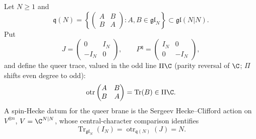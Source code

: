 \begin{defn}\label{defn:spin-hecke-queer-input}
  Let \(N\ge1\) and
  \[
    \mathfrak q(N)=
    \left\{
      \begin{pmatrix} A&B\\ B&A\end{pmatrix}:
      A,B\in\mathfrak{gl}_N
    \right\}\subset\mathfrak{gl}(N|N).
  \]
  Put
  \[
    J=\begin{pmatrix}0&I_N\\ -I_N&0\end{pmatrix},
    \qquad
    P^{\mathfrak q}=\begin{pmatrix}I_N&0\\0&-I_N\end{pmatrix},
  \]
  and define the queer trace, valued in the odd line \(\Pi\C\) (parity
  reversal of \(\C\); \(\Pi\) shifts even degree to odd):
  \[
    \operatorname{otr}
      \begin{pmatrix}A&B\\ B&A\end{pmatrix}
      =\operatorname{Tr}(B)\in\Pi\C .
  \]
  A spin-Hecke datum for the queer brane is the Sergeev
  Hecke--Clifford action on \(V^{\otimes n}\), \(V=\C^{N|N}\), whose
  central-character comparison identifies
  \[
    \operatorname{Tr}_{\mathfrak{gl}_N}(I_N)
      =
    \operatorname{otr}_{\mathfrak q(N)}(J)
      =N .
  \]
\end{defn}

